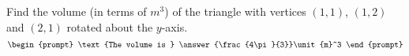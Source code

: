 \documentclass{ximera}
\author{Gregory Hartman \and Matthew Carr}
\begin{document}
\begin{exercise}






Find the volume (in terms of $\unit{m}^3$) of the triangle with vertices $(1,1)$, $(1,2)$ and $(2,1)$ rotated about the $y$-axis.
\[
\begin{prompt}
\text{The volume is } \answer{\frac{4\pi}{3}}\unit{m}^3
\end{prompt}
\]




\end{exercise}
\end{document}

